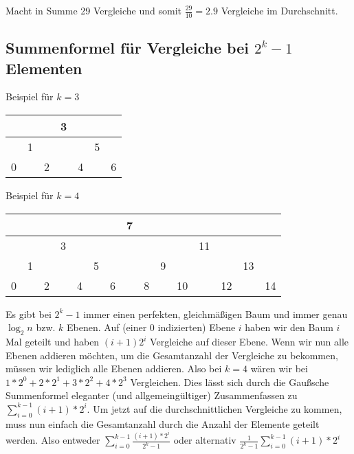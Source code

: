 \documentclass{article}
\begin{document}
\vspace{1em}

Macht in Summe 29 Vergleiche und somit $\frac{29}{10} = 2.9$ Vergleiche im Durchschnitt.

\subsection{Summenformel für Vergleiche bei $2^k - 1$ Elementen}

\begin{center}
	\vspace{1em}

	Beispiel für $k = 3$

	\vspace{0.5em}

	\begin{tabular}{|c|c|c|c|c|c|c|}
		\hline
		  &   &   & 3 &   &   &   \\
		\hline
		  & 1 &   &   &   & 5 &   \\
		\hline
		0 &   & 2 &   & 4 &   & 6 \\
		\hline
	\end{tabular}

	\vspace{1.5em}

	Beispiel für $k = 4$

	\vspace{0.5em}

	\begin{tabular}{|c|c|c|c|c|c|c|c|c|c|c|c|c|c|c|}
		\hline
		  &   &   &   &   &   &   & 7 &   &   &    &    &    &    &    \\
		\hline
		  &   &   & 3 &   &   &   &   &   &   &    & 11 &    &    &    \\
		\hline
		  & 1 &   &   &   & 5 &   &   &   & 9 &    &    &    & 13 &    \\
		\hline
		0 &   & 2 &   & 4 &   & 6 &   & 8 &   & 10 &    & 12 &    & 14 \\
		\hline
	\end{tabular}
\end{center}

\newpage

Es gibt bei $2^k - 1$ immer einen perfekten, gleichmäßigen Baum und immer genau $\log_2n$ bzw. $k$ Ebenen.
Auf (einer 0 indizierten) Ebene $i$ haben wir den Baum $i$ Mal geteilt und haben $(i + 1) 2^i$ Vergleiche
auf dieser Ebene. Wenn wir nun alle Ebenen addieren möchten, um die Gesamtanzahl der Vergleiche zu bekommen,
müssen wir lediglich alle Ebenen addieren. Also bei $k = 4$ wären wir bei $1 * 2^0 + 2 * 2^1 + 3 * 2^2 + 4 * 2^3$
Vergleichen. Dies lässt sich durch die Gaußsche Summenformel eleganter (und allgemeingültiger) Zusammenfassen
zu $\sum_{i=0}^{k - 1} (i + 1) * 2^i$. Um jetzt auf die durchschnittlichen Vergleiche zu kommen, muss nun einfach
die Gesamtanzahl durch die Anzahl der Elemente geteilt werden. Also entweder $\sum_{i=0}^{k - 1} \frac{(i + 1) * 2^i}{2^k - 1}$
oder alternativ $\frac{1}{2^k - 1}\sum_{i=0}^{k - 1} (i + 1) * 2^i$
\end{document}
